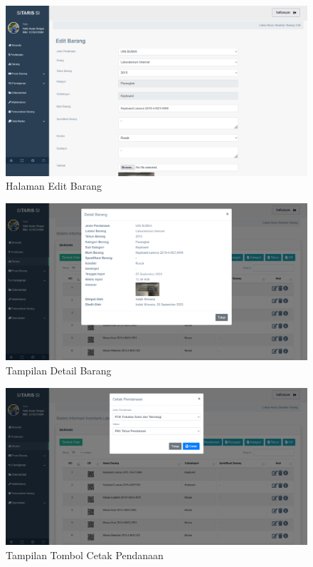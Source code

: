 \begin{enumerate}
        \begin{figure}
          \centering
          \includegraphics[width=0.82\linewidth]{konten//gambar/barang edit.png}
          \caption{Halaman Edit Barang}
          \label{fig:enter-label}
        \end{figure}

        \begin{figure}
          \centering
          \includegraphics[width=0.82\linewidth]{konten//gambar/barang detail.png}
          \caption{Tampilan Detail Barang}
          \label{fig:enter-label}
        \end{figure}

        \begin{figure}
          \centering
          \includegraphics[width=0.82\linewidth]{konten//gambar/barang cetak pendanaan.png}
          \caption{Tampilan Tombol Cetak Pendanaan}
          \label{fig:enter-label}
        \end{figure}


\end{enumerate}
